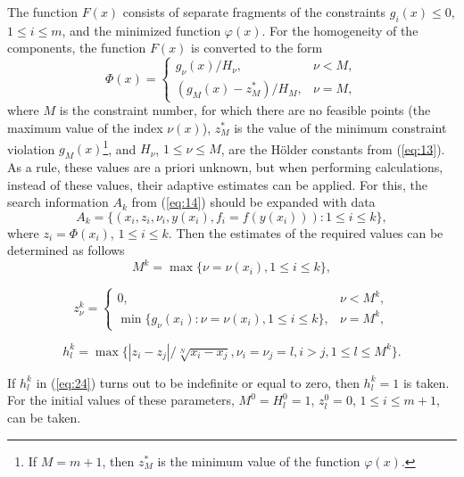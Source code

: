 \documentclass[smallextended]{svjour3}       %
\begin{document}
The function $F(x)$ consists of separate fragments of the constraints ${g_i(x) \leq 0}$, $1 \leq i \leq m$, and the minimized function $\varphi(x)$. For the homogeneity of the components, the function $F(x)$ is converted to the form 
\begin{equation}\label{eq:20}
\Phi (x) = 
 \begin{cases}
   g_\nu(x) / H_\nu, & \nu < M, \\
   (g_M(x)-z^*_M) / H_M, & \nu = M,
 \end{cases}
\end{equation}
where $M$ is the constraint number, for which there are no feasible points (the maximum value of the index $\nu(x)$), $z^*_M$ is the value of the minimum constraint violation $g_M(x)$\footnote{If $M=m+1$, then $z_M^*$ is the minimum value of the function $\varphi(x)$.}, and $H_\nu$, $1\leq \nu \leq M$, are the H\"older constants from (\ref{eq:13}). As a rule, these values are a priori unknown, but when performing calculations, instead of these values, their adaptive estimates can be applied. For this, the search information $A_k$ from (\ref{eq:14}) should be expanded with data
\begin{equation}\label{eq:21}
A_k=\{(x_i, z_i, \nu_i, y(x_i), f_i=f(y(x_i))): 1 \leq i \leq k \},
\end{equation}
where $z_i= \Phi(x_i)$, $1 \leq i \leq k$. Then the estimates of the required values can be determined as follows
\begin{equation}\label{eq:22}
M^k = \max{\{\nu=\nu(x_i), 1\leq i \leq k \}},
\end{equation}

\begin{equation}\label{eq:23}
z^k_\nu = 
 \begin{cases}
   0, & \nu < M^k, \\
   \min{\{g_\nu(x_i):\nu=\nu(x_i), 1\leq i \leq k \}}, & \nu = M^k,
 \end{cases}
\end{equation}

\begin{equation}\label{eq:24}
h^k_l=\max{\{|z_i-z_j|/\sqrt[N]{x_i-x_j}, \nu_i=\nu_j=l, i>j, 1\leq l\leq M^k\}}.
\end{equation}

If $h_l^k$ in (\ref{eq:24}) turns out to be indefinite or equal to zero, then $h_l^k=1$ is taken. For the initial values of these parameters, $M^0 = H_l^0 = 1$, $z_l^0 = 0$, $1 \leq i \leq m+1$, can be taken.
\end{document}
